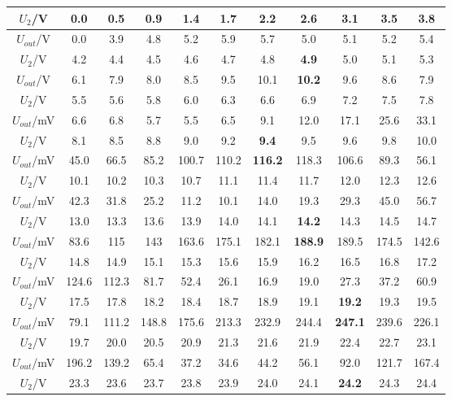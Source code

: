 \documentclass[a4paper,10pt,notitlepage]{article}
\begin{document}
\begin{center}
	\begin{longtable}{|c|c|c|c|c|c|c|c|c|c|c|}
	\hline
	$U_2$/V & 0.0 & 0.5 & 0.9 & 1.4 & 1.7 & 2.2 & 2.6 & 3.1 & 3.5 & 3.8 \\
	\hline
	$U_{out}$/V & 0.0 & 3.9 & 4.8 & 5.2 & 5.9 & 5.7 & 5.0 & 5.1 & 5.2 & 5.4 \\
	\hline
	\hline
	$U_2$/V & 4.2 & 4.4 & 4.5 & 4.6 & 4.7 & 4.8 & \textbf{4.9} & 5.0 & 5.1 & 5.3 \\
	\hline
	$U_{out}$/V & 6.1 & 7.9 & 8.0 & 8.5 & 9.5 & 10.1 & \textbf{10.2} & 9.6 & 8.6 & 7.9 \\
	\hline
	\hline
	$U_2$/V & 5.5 & 5.6 & 5.8 & 6.0 & 6.3 & 6.6 & 6.9 & 7.2 & 7.5 & 7.8 \\
	\hline
	$U_{out}$/mV & 6.6 & 6.8 & 5.7 & 5.5 & 6.5 & 9.1 & 12.0 & 17.1 & 25.6 & 33.1 \\
	\hline
	\hline
	$U_2$/V & 8.1 & 8.5 & 8.8 & 9.0 & 9.2 & \textbf{9.4} & 9.5 & 9.6 & 9.8 & 10.0 \\
	\hline
	$U_{out}$/mV & 45.0 & 66.5 & 85.2 & 100.7 & 110.2 & \textbf{116.2} & 118.3 & 106.6 & 89.3 & 56.1 \\
	\hline
	\hline
	$U_2$/V & 10.1 & 10.2 & 10.3 & 10.7 & 11.1 & 11.4 & 11.7 & 12.0 & 12.3 & 12.6 \\
	\hline
	$U_{out}$/mV & 42.3 & 31.8 & 25.2 & 11.2 & 10.1 & 14.0 & 19.3 & 29.3 & 45.0 & 56.7 \\
	\hline
	\hline
	$U_2$/V & 13.0 & 13.3 & 13.6 & 13.9 & 14.0 & 14.1 & \textbf{14.2} & 14.3 & 14.5 & 14.7 \\
	\hline
	$U_{out}$/mV & 83.6 & 115 & 143 & 163.6 & 175.1 & 182.1 & \textbf{188.9} & 189.5 & 174.5 & 142.6 \\
	\hline
	\hline
	$U_2$/V & 14.8 & 14.9 & 15.1 & 15.3 & 15.6 & 15.9 & 16.2 & 16.5 & 16.8 & 17.2 \\
	\hline
	$U_{out}$/mV & 124.6 & 112.3 & 81.7 & 52.4 & 26.1 & 16.9 & 19.0 & 27.3 & 37.2 & 60.9 \\
	\hline
	\hline
	$U_2$/V & 17.5 & 17.8 & 18.2 & 18.4 & 18.7 & 18.9 & 19.1 & \textbf{19.2} & 19.3 & 19.5 \\
	\hline
	$U_{out}$/mV & 79.1 & 111.2 & 148.8 & 175.6 & 213.3 & 232.9 & 244.4 & \textbf{247.1} & 239.6 & 226.1 \\
	\hline
	\hline
	$U_2$/V & 19.7 & 20.0 & 20.5 & 20.9 & 21.3 & 21.6 & 21.9 & 22.4 & 22.7 & 23.1 \\
	\hline
	$U_{out}$/mV & 196.2 & 139.2 & 65.4 & 37.2 & 34.6 & 44.2 & 56.1 & 92.0 & 121.7 & 167.4 \\
	\hline
	\hline
	$U_2$/V & 23.3 & 23.6 & 23.7 & 23.8 & 23.9 & 24.0 & 24.1 & \textbf{24.2} & 24.3 & 24.4 \\

\end{longtable}
\end{center}
\end{document}
